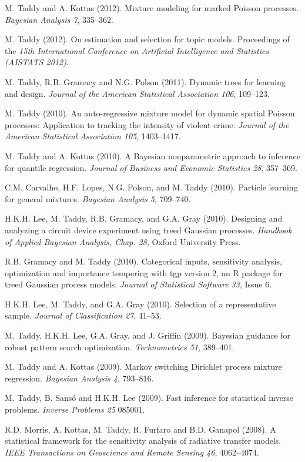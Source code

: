 \documentclass[margin,line]{res}
\begin{document}
\begin{resume}
M.  Taddy and A. Kottas (2012). Mixture modeling for marked Poisson processes.
{\it Bayesian Analysis 7}, 335--362.


M. Taddy (2012). On estimation and selection for topic models. Proceedings of the {\it 15th International Conference on
  Artificial Intelligence and Statistics (AISTATS 2012)}.


M. Taddy, R.B. Gramacy and N.G. Polson (2011). Dynamic trees for learning and design.
 {\it Journal of the American Statistical
  Association 106}, 109--123.

M. Taddy (2010). An auto-regressive mixture model for dynamic spatial
Poisson processes: Application to tracking the intensity of violent
crime.  {\it Journal of the American Statistical
  Association 105}, 1403--1417.

M.  Taddy and A. Kottas (2010). A Bayesian nonparametric approach to inference for quantile regression.
{\it Journal of Business and Economic Statistics 28}, 357--369.

C.M. Carvalho, H.F. Lopes, N.G. Polson, and M. Taddy
(2010). Particle learning for general mixtures.  {\it Bayesian
  Analysis 5}, 709--740.

H.K.H. Lee, M. Taddy, R.B. Gramacy, and G.A. Gray
(2010). Designing and analyzing a circuit device experiment using
treed Gaussian processes.  {\it Handbook of Applied
  Bayesian Analysis, Chap. 28}, Oxford University Press.

R.B. Gramacy and M. Taddy (2010). Categorical inputs, sensitivity
       analysis, optimization and importance tempering with tgp version 2, an
       R package for treed Gaussian process models. {\it Journal of Statistical Software 33}, Issue 6.


H.K.H. Lee, M. Taddy, and G.A. Gray (2010). Selection of a representative sample.
{\it Journal of Classification 27}, 41--53.

M.  Taddy, H.K.H. Lee, G.A. Gray, and J. Griffin (2009).  Bayesian guidance for robust pattern search optimization.
{\it Technometrics 51}, 389--401.

M. Taddy and A. Kottas (2009).  Markov switching Dirichlet process mixture regression.
{\it Bayesian Analysis 4}, 793--816.

M.  Taddy, B. Sans\'o and H.K.H. Lee (2009). Fast inference for statistical inverse problems.  {\it Inverse Problems 25} 085001.

R.D. Morris, A. Kottas, M. Taddy, R. Furfaro and B.D. Ganapol (2008).
A statistical framework for the sensitivity analysis of radiative transfer models.
{\it IEEE Transactions on Geoscience and Remote Sensing 46}, 4062--4074.


\end{resume}
\end{document}
